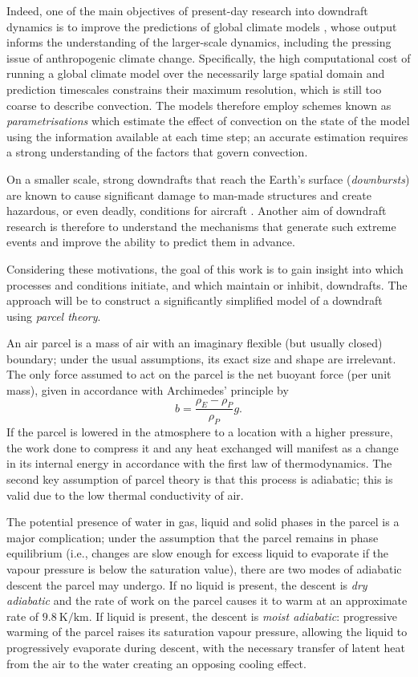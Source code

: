 \documentclass[12pt,titlepage]{article}
\begin{document}
Indeed, one of the main objectives of present-day research into
downdraft dynamics is to improve the predictions of global climate
models \parencite{thayer-calder_2013}, whose output informs the
understanding of the larger-scale
dynamics, including the pressing issue of anthropogenic climate
change. Specifically, the high computational cost of running a global
climate model over the necessarily large spatial domain and prediction
timescales constrains their maximum resolution, which is still too
coarse to describe convection. The models therefore employ schemes
known as \emph{parametrisations} which estimate the effect of
convection on the state of the model using the information available
at each time step; an accurate estimation requires a strong
understanding of the factors that govern convection.

On a smaller scale, strong downdrafts that reach the Earth's surface
(\emph{downbursts}) are known to cause significant damage to
man-made structures and create hazardous, or even deadly, conditions
for aircraft \parencite{thayer-calder_2013}. Another aim of downdraft
research is therefore to understand the mechanisms that generate
such extreme events and improve the ability to predict them in advance.

Considering these motivations, the goal of this work is to gain
insight into which processes and conditions initiate, and which
maintain or inhibit, downdrafts. The approach will be to construct
a significantly simplified model of a downdraft using \emph{parcel
theory}.

An air parcel is a mass of air with an imaginary flexible (but usually
closed) boundary; under the usual assumptions, its exact size and
shape are irrelevant. The only force assumed to act on the parcel is
the net buoyant force (per unit mass), given in accordance with
Archimedes' principle by
\begin{equation}
	b = \frac{\rho_E - \rho_P}{\rho_P} g.
	\label{eqn:buoyancy}
\end{equation}
If the parcel is lowered in the atmosphere to a location with a higher
pressure, the work done to compress it and any heat exchanged will
manifest as a change in its internal energy in accordance with the
first law of thermodynamics. The second key assumption of parcel theory
is that this process is adiabatic; this is valid due to the low
thermal conductivity of air.

The potential presence of water in gas, liquid and solid phases in the
parcel is a major complication; under the assumption that the parcel
remains in phase equilibrium (i.e., changes are slow enough for
excess liquid to evaporate if the vapour pressure is below the
saturation value), there are two modes of adiabatic descent the parcel
may undergo. If no liquid is present, the descent is \emph{dry
adiabatic} and the rate of work on the parcel causes it to warm at
an approximate rate of $\SI{9.8}{\kelvin \per\kilo\meter}$.
If liquid is present, the descent is \emph{moist adiabatic}:
progressive warming of the parcel raises its saturation vapour pressure,
allowing the liquid to progressively evaporate during descent,
with the necessary transfer of latent heat from the air to the water
creating an opposing cooling effect.
\end{document}

